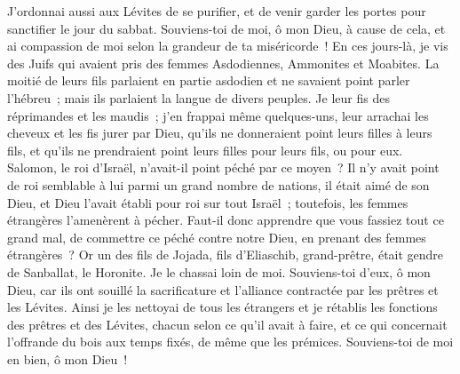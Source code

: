 \begin{multicols}{2}
J'ordonnai aussi aux Lévites de se purifier, et de venir garder les portes pour sanctifier le jour du sabbat. Souviens-toi de moi, ô mon Dieu, à cause de cela, et ai compassion de moi selon la grandeur de ta miséricorde~!
En ces jours-là, je vis des Juifs qui avaient pris des femmes Asdodiennes, Ammonites et Moabites.
La moitié de leurs fils parlaient en partie asdodien et ne savaient point parler l'hébreu~; mais ils parlaient la langue de divers peuples.
Je leur fis des réprimandes et les maudis~; j'en frappai même quelques-uns, leur arrachai les cheveux et les fis jurer par Dieu, qu'ils ne donneraient point leurs filles à leurs fils, et qu'ils ne prendraient point leurs filles pour leurs fils, ou pour eux.
Salomon, le roi d'Israël, n'avait-il point péché par ce moyen~? Il n'y avait point de roi semblable à lui parmi un grand nombre de nations, il était aimé de son Dieu, et Dieu l'avait établi pour roi sur tout Israël~; toutefois, les femmes étrangères l'amenèrent à pécher.
Faut-il donc apprendre que vous fassiez tout ce grand mal, de commettre ce péché contre notre Dieu, en prenant des femmes étrangères~?
Or un des fils de Jojada, fils d'Eliaschib, grand-prêtre, était gendre de Sanballat, le Horonite. Je le chassai loin de moi.
Souviens-toi d'eux, ô mon Dieu, car ils ont souillé la sacrificature et l'alliance contractée par les prêtres et les Lévites.
Ainsi je les nettoyai de tous les étrangers et je rétablis les fonctions des prêtres et des Lévites, chacun selon ce qu'il avait à faire,
et ce qui concernait l'offrande du bois aux temps fixés, de même que les prémices. Souviens-toi de moi en bien, ô mon Dieu~!
\PPE{}
\end{multicols}
